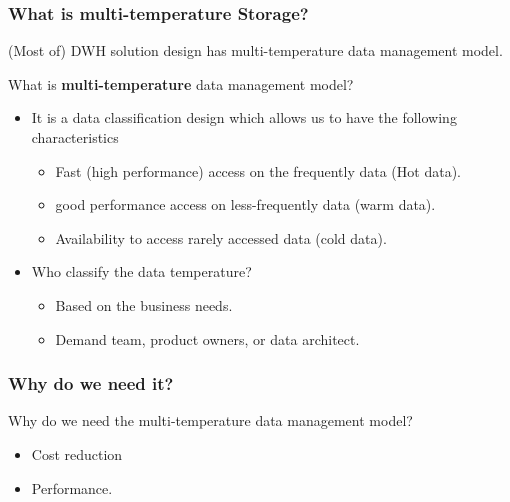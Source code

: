 \begin{frame}
\frametitle{What is multi-temperature Storage?}

\begin{wideitemize}
	\item (Most of) DWH solution design has multi-temperature data management model.
	\item What is \textbf{multi-temperature} data management model?
	\begin{itemize}[<+->]
		\item It is a data classification design which allows us to have the following characteristics 
			\begin{itemize}[<+->] 
				\item Fast (high performance) access on the frequently data (Hot data).%
				\item good performance access on less-frequently data (warm data).
				\item Availability to access rarely accessed data (cold data).
			\end{itemize}
 		\item Who classify the data temperature? 
 		\begin{itemize}[<+->] 
 			\item Based on the business needs.
 			\item Demand team, product owners, or data architect.
 		\end{itemize}
 		
	\end{itemize}

\end{wideitemize}
\end{frame}


\begin{frame}
\frametitle{Why do we need it?}

\begin{wideitemize}
	\item Why do we need the multi-temperature data management model?
	\begin{itemize}[<+->]
		\item Cost reduction \blue{\faDollar \faDollar \faDollar \faDollar}
		\item Performance.
	\end{itemize}
\end{wideitemize}
\end{frame}

